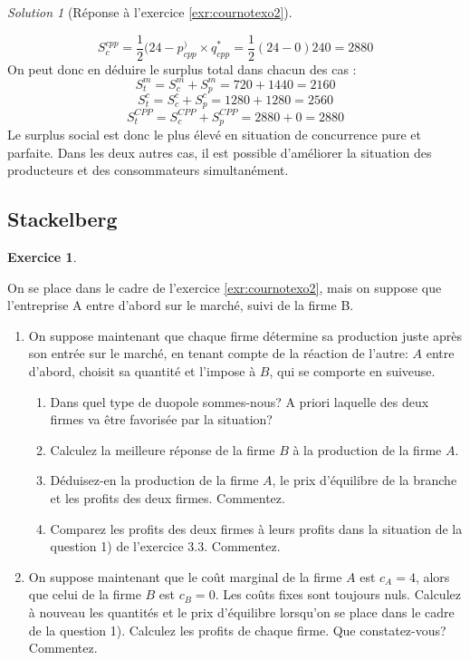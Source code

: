 \documentclass[
]{book}
\providecommand{\tightlist}{%
  \setlength{\itemsep}{0pt}\setlength{\parskip}{0pt}}
\theoremstyle{definition}
\theoremstyle{definition}
\theoremstyle{definition}
\newtheorem{exercise}{Exercice}[chapter]
\theoremstyle{definition}
\theoremstyle{remark}
\newtheorem*{solution}{Solution}
\begin{document}
\begin{solution}[Réponse à l'exercice \ref{exr:cournotexo2}]
\begin{enumerate}
\begin{enumerate}
    \[S_c^{cpp}=\frac{1}{2}(24-p_{cpp}^)\times q_{cpp}^*=\frac{1}{2}(24-0)240=2880\]
    On peut donc en déduire le surplus total dans chacun des cas :
    \[S_t^m=S_c^m+S_p^m=720+1440=2160\]
    \[S_t^c=S_c^c+S_p^c=1280+1280=2560\]
    \[S_t^{CPP}=S_c^{CPP}+S_p^{CPP}=2880+0=2880\]
    Le surplus social est donc le plus élevé en situation de concurrence pure et parfaite.
    Dans les deux autres cas, il est possible d'améliorer la situation des producteurs et des consommateurs simultanément.
  \end{enumerate}
\end{enumerate}

\end{solution}

\hypertarget{stackelberg}{%
\subsection{Stackelberg}\label{stackelberg}}

\begin{exercise}
\protect\hypertarget{exr:stackexo1}{}\label{exr:stackexo1}

On se place dans le cadre de l'exercice \ref{exr:cournotexo2}, mais on suppose que l'entreprise A entre d'abord sur le marché, suivi de la firme B.

\begin{enumerate}
\def\labelenumi{\arabic{enumi}.}
\tightlist
\item
  On suppose maintenant que chaque firme détermine sa production juste après son entrée sur le marché, en tenant compte de la réaction de l'autre: \(A\) entre d'abord, choisit sa quantité et l'impose à \(B\), qui se comporte en suiveuse.

  \begin{enumerate}
  \def\labelenumii{\alph{enumii}.}
  \tightlist
  \item
    Dans quel type de duopole sommes-nous? A priori laquelle des deux firmes va être favorisée par la situation?
  \item
    Calculez la meilleure réponse de la firme \(B\) à la production de la firme \(A\).
  \item
    Déduisez-en la production de la firme \(A\), le prix d'équilibre de la branche et les profits des deux firmes. Commentez.
  \item
    Comparez les profits des deux firmes à leurs profits dans la situation de la question 1) de l'exercice 3.3. Commentez.
  \end{enumerate}
\item
  On suppose maintenant que le coût marginal de la firme \(A\) est \(c_A=4\), alors que celui de la firme \(B\) est \(c_B=0\). Les coûts fixes sont toujours nuls.
  Calculez à nouveau les quantités et le prix d'équilibre lorsqu'on se place dans le cadre de la question 1). Calculez les profits de chaque firme. Que constatez-vous? Commentez.
\end{enumerate}

\end{exercise}
\end{document}
